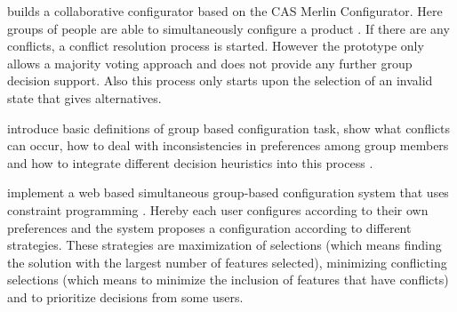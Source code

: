 \begin{description}[style=unboxed, leftmargin=0cm, font=\normalfont]
    \item[\citeauthor{raabKollaborativeProduktkonfigurationEchtzeit2019}] builds a collaborative configurator based on the CAS Merlin Configurator. Here groups of people are able to simultaneously configure a product \cite{raabKollaborativeProduktkonfigurationEchtzeit2019}. If there are any conflicts, a conflict resolution process is started. However the prototype only allows a majority voting approach and does not provide any further group decision support. Also this process only starts upon the selection of an invalid state that gives alternatives.

    \item[\citeauthor{felferningGroupBasedConfiguration2016}] introduce basic definitions of group based configuration task, show what conflicts can occur, how to deal with inconsistencies in preferences among group members and how to integrate different decision heuristics into this process \cite{felferningGroupBasedConfiguration2016}.

    \item[\citeauthor{velasquez-guevaraMultiSPLOTSupportingMultiuser2018}] implement a web based simultaneous group-based configuration system that uses constraint programming \cite{velasquez-guevaraMultiSPLOTSupportingMultiuser2018}. Hereby each user configures according to their own preferences and the system proposes a configuration according to different strategies. These strategies are maximization of selections (which means finding the solution with the largest number of features selected), minimizing conflicting selections (which means to minimize the inclusion of features that have conflicts) and to prioritize decisions from some users.
\end{description}

